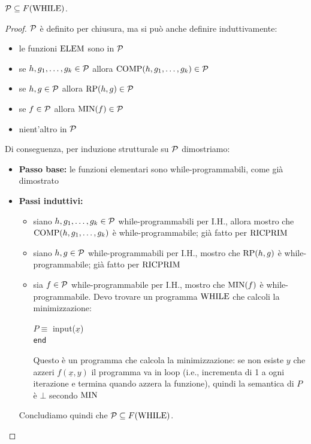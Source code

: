 \begin{theor}
	$\mathcal{P} \subseteq F(\text{WHILE})$.
\end{theor}
\begin{proof}
	$\mathcal{P}$ è definito per chiusura, ma si può anche definire induttivamente:
	\begin{itemize}
		\item le funzioni $\text{ELEM}$ sono in $\mathcal{P}$
		\item se $h, g_1, \dots, g_k \in \mathcal{P}$ allora $\text{COMP} (h, g_1, \dots, g_k) \in \mathcal{P}$
		\item se $h,g \in \mathcal{P}$ allora $\text{RP} (h,g) \in \mathcal{P}$
		\item se $f \in \mathcal{P}$ allora $\operatorname{MIN}(f) \in \mathcal{P}$
		\item nient'altro in $\mathcal{P}$
	\end{itemize}
	
	Di conseguenza, per induzione strutturale su $\mathcal{P}$ dimostriamo:
	\begin{itemize}
		\item \textbf{Passo base:} le funzioni elementari sono while-programmabili, come già dimostrato
		\item \textbf{Passi induttivi:}
		\begin{itemize}
			\item siano $h,g_1, \dots, g_k \in \mathcal{P}$ while-programmabili per I.H., allora mostro che $\text{COMP} (h, g_1, \dots, g_k)$ è while-programmabile; già fatto per $\text{RICPRIM}$
			\item siano $h,g \in \mathcal{P}$ while-programmabili per I.H., mostro che $\text{RP}(h,g)$ è while-programmabile; già fatto per $\text{RICPRIM}$
			\item sia $f \in \mathcal{P}$ while-programmabile per I.H., mostro che $\operatorname{MIN}(f)$ è while-programmabile. Devo trovare un programma $\text{WHILE}$ che calcoli la minimizzazione:
			\begin{center}
				\begin{minipage}{.85\textwidth}
					\begin{tcolorbox}[colback=white,sharp corners,boxrule=.3mm]
						\begin{algorithm}[H]
							\SetAlgoNoEnd
							$P \equiv$ input($\underline{x}$) \\
							\texttt{end}
						\end{algorithm}
					\end{tcolorbox} 
				\end{minipage}
			\end{center}
			Questo è un programma che calcola la minimizzazione: se non esiste $y$ che azzeri $f(\underline{x}, y)$ il programma va in loop (i.e., incrementa di 1 a ogni iterazione e termina quando azzera la funzione), quindi la semantica di $P$ è $\bot$ secondo $\operatorname{MIN}$
		\end{itemize}
		
		Concludiamo quindi che $\mathcal{P} \subseteq F(\text{WHILE})$.\\
	\end{itemize}
\end{proof}
